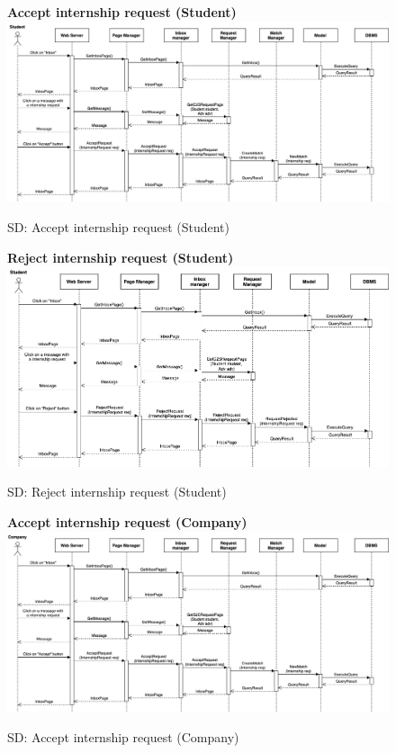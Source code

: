 \begin{figure}[H]
\textbf{Accept internship request (Student)}\newline\newline
\includegraphics[width=15cm]{images/architectural design/runtime/DD-UC16.1.drawio.png}
    \caption{SD: Accept internship request (Student)}
\end{figure}

\begin{figure}[H]
\textbf{Reject internship request (Student)}\newline\newline
\includegraphics[width=15cm]{images/architectural design/runtime/DD-UC16.2.drawio.png}
    \caption{SD: Reject internship request (Student)}
\end{figure}

\begin{figure}[H]
\textbf{Accept internship request (Company)}\newline\newline
\includegraphics[width=15cm]{images/architectural design/runtime/DD-UC17.1.drawio.png}
    \caption{SD: Accept internship request (Company)}
\end{figure}

